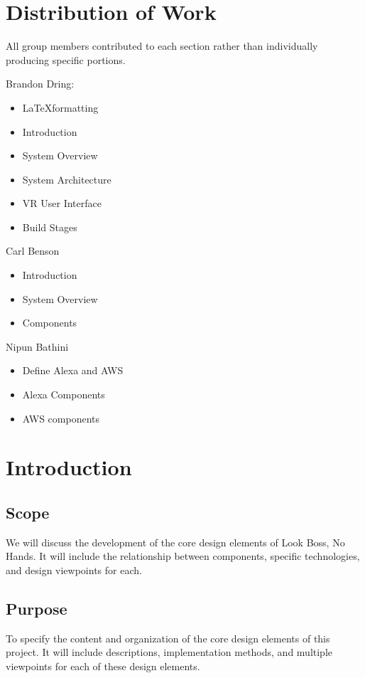 \documentclass[onecolumn, draftclsnofoot,10pt, compsoc]{IEEEtran}
\begin{document}
\section{Distribution of Work}
All group members contributed to each section rather than individually producing specific portions.

Brandon Dring:
\begin{itemize}
    \item \LaTeX \hspace{2pt}formatting %
    \item Introduction
    \item System Overview
    \item System Architecture
    \item VR User Interface
    \item Build Stages
\end{itemize}
Carl Benson
\begin{itemize}
    \item Introduction
    \item System Overview
    \item Components
\end{itemize} 
Nipun Bathini
\begin{itemize}
    \item Define Alexa and AWS
    \item Alexa Components 
    \item AWS components 
\end{itemize}

\section{Introduction}
    \subsection{Scope}
        We will discuss the development of the core design elements of Look Boss, No Hands. It will include the relationship between components, specific technologies, and design viewpoints for each.
        
    \subsection{Purpose}
        To specify the content and organization of the core design elements of this project. It will include descriptions, implementation methods, and multiple viewpoints for each of these design elements.
        
\end{document}
